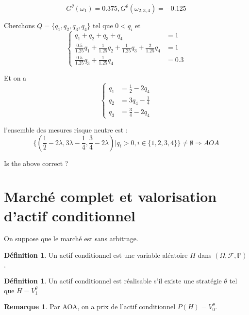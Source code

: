 \documentclass{article}
\theoremstyle{plain}
\theoremstyle{definition}
\newtheorem{defn}[thm]{D\'efinition}
\newtheorem{remq}[thm]{Remarque}
\begin{document}
\begin{equation}
G^\theta(\omega_1)=0.375, G^\theta(\omega_{2,3,4})=-0.125
\end{equation}

Cherchons $Q=\{q_1,q_2,q_3,q_4\}$ tel que $0<q_i$ et
\begin{equation}
\left\{ \begin{array}{rcl}
	q_1+q_2+q_3+q_4 &= 1 \\
	\frac{0.5}{1.25} q_1+\frac{1}{1.25} q_2+\frac{1}{1.25} q_3 + \frac{2}{1.25} q_4 &= 1 \\
	\frac{0.5}{1.25} q_3 + \frac{1}{1.25} q_4 &=0.3
\end{array}\right.
\end{equation}

Et on a
\begin{equation}
\left\{ \begin{array}{rcl}
q_1&=\frac{1}{2}-2q_4 \\
q_2&=3q_4-\frac{1}{4} \\ 
q_3&=\frac{3}{4}-2q_4
\end{array}\right.
\end{equation}

l'ensemble des mesures risque neutre est :
\begin{equation}
\{(\frac{1}{2}-2\lambda,3\lambda-\frac{1}{4},\frac{3}{4}-2\lambda)|q_i>0,i\in\{1,2,3,4\}\}\neq\emptyset \Rightarrow AOA
\end{equation}

{\color{red} Is the above correct ?}

\section{March\'e complet et valorisation d'actif conditionnel}

On suppose que le march\'e est sans arbitrage.

\begin{defn}
	Un actif conditionnel est une variable al\'eatoire $H$ dans $(\Omega, \mathcal{F}, \mathbb{P})$.
\end{defn}

\begin{defn}
	Un actif conditionnel est r\'ealisable s'il existe une strat\'egie $\theta$ tel que $H=V_1^\theta$
\end{defn}

\begin{remq}
	Par AOA, on a prix de l'actif conditionnel $P(H)=V_0^\theta$.
\end{remq}
\end{document}
